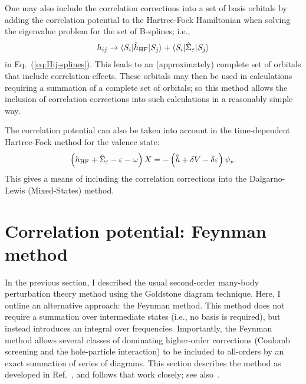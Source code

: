 \documentclass[10pt,twocolumn,a4paper]{article}%
\newcommand{\bra}[1]{\ensuremath{\langle #1|}}	%
\newcommand{\ket}[1]{\ensuremath{|#1\rangle}}	%
\newcommand{\be}{\begin{equation}}
\newcommand{\ee}{\end{equation}}
\def\en{\ensuremath{\varepsilon}}
\newcommand{\w}{\ensuremath{\omega}}
\begin{document}
One may also include the correlation corrections into a set of basis orbitals by adding the correlation potential to the Hartree-Fock Hamiltonian when solving the eigenvalue problem for the set of B-splines; i.e.,
\be
h_{ij} \to \bra{S_i}\hat h_{\rm HF}\ket{S_j}  + \bra{S_i}\hat \Sigma_\en\ket{S_j}
\ee
in Eq.~(\ref{eq:Hij-splines}).
This leads to an (approximately) complete set of orbitals that include correlation effects.
These orbitals may then be used in calculations requiring a summation of a complete set of orbitals; so this method allows the inclusion of correlation corrections into such calculations in a reasonably simple way.


The correlation potential can also be taken into account in the time-dependent Hartree-Fock method for the valence state:
\be
\left( h_{\rm HF} +\hat\Sigma_\en -  \en -\w \right)X = -\left(\hat h + \delta V - \delta \en \right)\psi_v.
\ee
This gives a means of including the correlation corrections into the Dalgarno-Lewis (Mixed-States) method.












\section{Correlation potential: Feynman method}


In the previous section, I described the usual second-order many-body perturbation theory method using the Goldstone diagram technique.
Here, I outline an alternative approach: the Feynman method.
This method does not require a summation over intermediate states (i.e., no basis is required), but instead introduces an integral over frequencies.
Importantly, the Feynman method allows several classes of dominating higher-order corrections (Coulomb screening and the hole-particle interaction) to be included to all-orders by an exact summation of series of diagrams.
This section describes the method as developed in Ref.~\cite{DzubaCPM1988pla}, and follows that work closely; see also~\cite{Abrikosov1965,DzubaCPM1989plaEn,GingesCs2002}.
\end{document}
